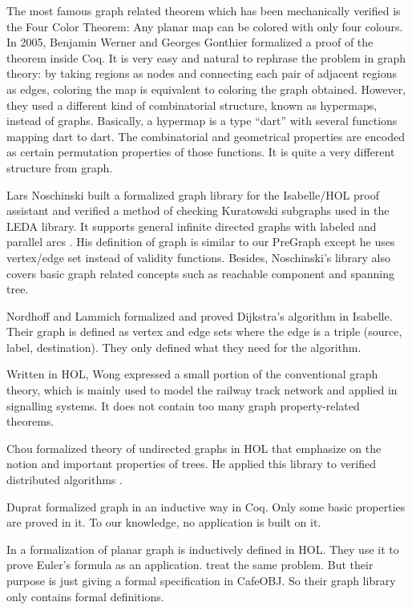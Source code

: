 The most famous graph related theorem which has been mechanically
verified is the Four Color Theorem: Any planar map can be colored with
only four colours. In 2005, Benjamin Werner and Georges Gonthier
formalized a proof of the theorem \cite{gonthier2005computer} inside
Coq. It is very easy and natural to rephrase the problem in graph
theory: by taking regions as nodes and connecting each pair of
adjacent regions as edges, coloring the map is equivalent to coloring
the graph obtained. However, they used a different kind of
combinatorial structure, known as hypermaps, instead of
graphs. Basically, a hypermap is a type ``dart'' with several
functions mapping dart to dart. The combinatorial and geometrical
properties are encoded as certain permutation properties of those
functions. It is quite a very different structure from graph.

Lars Noschinski built a formalized graph library for the Isabelle/HOL
proof assistant and verified a method of checking Kuratowski subgraphs
used in the LEDA library. It supports general infinite directed graphs
with labeled and parallel arcs \cite{Noschinski2015}. His definition
of graph is similar to our PreGraph except he uses vertex/edge set
instead of validity functions. Besides, Noschinski's library also
covers basic graph related concepts such as reachable component and
spanning tree.

Nordhoff and Lammich \cite{Dijkstra_Shortest_Path-AFP} formalized and
proved Dijkstra's algorithm in Isabelle. Their graph is defined as
vertex and edge sets where the edge is a triple (source, label,
destination). They only defined what they need for the algorithm.

Written in HOL, Wong \cite{wong1991} expressed a small portion of the
conventional graph theory, which is mainly used to model the railway
track network and applied in signalling systems. It does not contain
too many graph property-related theorems.

Chou \cite{chou1994formal} formalized theory of undirected graphs in
HOL that emphasize on the notion and important properties of trees. He
applied this library to verified distributed algorithms
\cite{chou1995mechanical}.

Duprat \cite{duprat2001coq} formalized graph in an inductive way in
Coq. Only some basic properties are proved in it. To our knowledge, no
application is built on it.

In \cite{yamamoto1995formalization} a formalization of planar graph is
inductively defined in HOL. They use it to prove Euler's formula as an
application. \cite{tamai2000formal} treat the same problem. But their
purpose is just giving a formal specification in CafeOBJ. So their
graph library only contains formal definitions.

